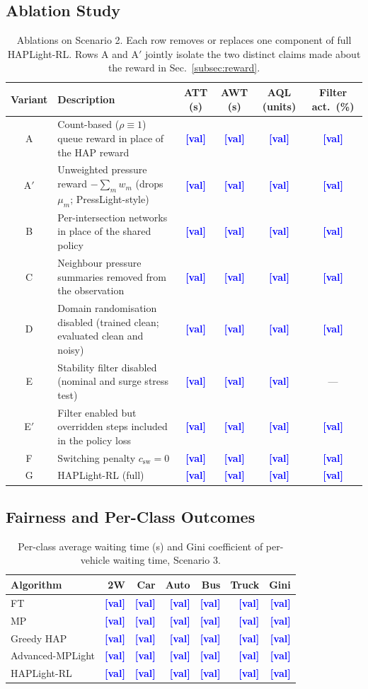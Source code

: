 \documentclass[journal]{IEEEtran}
\newcommand{\pl}{\textcolor{blue}{\textbf{[val]}}}
\begin{document}
\subsection{Ablation Study}
\label{subsec:ablation}
\begin{table}[htbp]
\caption{Ablations on Scenario 2. Each row removes or replaces one
component of full HAPLight-RL. Rows A and A$'$ jointly isolate the two
distinct claims made about the reward in Sec.~\ref{subsec:reward}.}
\label{tab:ablation}
\centering
\footnotesize
\begin{tabular}{@{}clcccc@{}}
\toprule
Variant & Description & ATT (s) & AWT (s) & AQL (units) & Filter act.\ (\%) \\
\midrule
A  & Count-based ($\rho\equiv1$) queue reward in place of the HAP reward & \pl & \pl & \pl & \pl \\
A$'$ & Unweighted pressure reward $-\sum_m w_m$ (drops $\mu_m$; PressLight-style) & \pl & \pl & \pl & \pl \\
B  & Per-intersection networks in place of the shared policy & \pl & \pl & \pl & \pl \\
C  & Neighbour pressure summaries removed from the observation & \pl & \pl & \pl & \pl \\
D  & Domain randomisation disabled (trained clean; evaluated clean and noisy) & \pl & \pl & \pl & \pl \\
E  & Stability filter disabled (nominal and surge stress test) & \pl & \pl & \pl & --- \\
E$'$ & Filter enabled but overridden steps included in the policy loss & \pl & \pl & \pl & \pl \\
F  & Switching penalty $c_{\mathrm{sw}}=0$ & \pl & \pl & \pl & \pl \\
G  & HAPLight-RL (full) & \pl & \pl & \pl & \pl \\
\bottomrule
\end{tabular}
\end{table}

\subsection{Fairness and Per-Class Outcomes}
\begin{table}[htbp]
\caption{Per-class average waiting time (s) and Gini coefficient of
per-vehicle waiting time, Scenario 3.}
\label{tab:fairness}
\centering
\footnotesize
\begin{tabularx}{\columnwidth}{@{}Xrrrrrr@{}}
\toprule
Algorithm & 2W & Car & Auto & Bus & Truck & Gini \\
\midrule
FT               & \pl & \pl & \pl & \pl & \pl & \pl \\
MP               & \pl & \pl & \pl & \pl & \pl & \pl \\
Greedy HAP       & \pl & \pl & \pl & \pl & \pl & \pl \\
Advanced-MPLight & \pl & \pl & \pl & \pl & \pl & \pl \\
HAPLight-RL      & \pl & \pl & \pl & \pl & \pl & \pl \\
\bottomrule
\end{tabularx}
\end{table}
\end{document}
